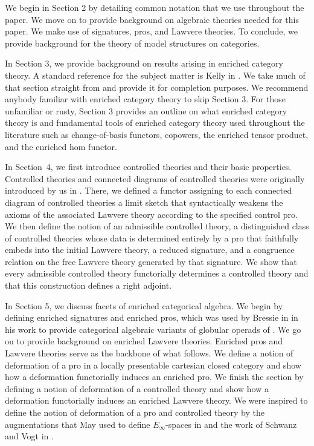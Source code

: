 \documentclass{tac}
\begin{document}
We begin in Section 2 by detailing common notation that we use throughout the paper. We move on to provide background on algebraic theories needed for this paper. We make use of signatures, pros, and Lawvere theories. To conclude, we provide background for the theory of model structures on categories. 

In Section 3, we provide background on results arising in enriched category theory. A standard reference for the subject matter is Kelly in \cite{Kelly3}. We take much of that section straight from \cite{Kelly3} and provide it for completion purposes. We recommend anybody familiar with enriched category theory to skip Section 3.
For those unfamiliar or rusty, Section 3 provides an outline on what enriched category theory is and fundamental tools of enriched category theory used throughout the literature such as change-of-basis functors, copowers, the enriched tensor product, and the enriched hom functor. 

In Section~4, we first introduce controlled theories and their basic properties. Controlled theories and connected diagrams of controlled theories were originally introduced by us in \cite{Taylor2026}. There, we defined a functor assigning to each connected diagram of controlled theories a limit sketch that syntactically weakens the axioms of the associated Lawvere theory according to the specified control pro. We then define the notion of an admissible controlled theory, a distinguished class of controlled theories whose data is determined entirely by a pro that faithfully embeds into the initial Lawvere theory, a reduced signature, and a congruence relation on the free Lawvere theory generated by that signature.  We show that every admissible controlled theory functorially determines a controlled theory and that this construction defines a right adjoint.

 In Section 5, we discuss facets of enriched categorical algebra. We begin by defining enriched signatures and enriched pros, which was used by Bressie in \cite{Bressie2020} in his work to provide categorical algebraic variants of globular operads of \cite{Lein}. We go on to provide background on enriched Lawvere theories. Enriched pros and Lawvere theories serve as the backbone of what follows. We define a notion of deformation of a pro in a locally presentable cartesian closed category and show how a deformation functorially induces an enriched pro. We finish the section by defining a notion of deformation of a controlled theory and show how a deformation functorially induces an enriched Lawvere theory.
 We were inspired to define the notion of deformation of a pro and controlled theory by the augmentations that May used to define $E_\infty$-spaces in \cite{May2} and the work of Schwanz and Vogt in \cite{SchwanzlVogt1989}. 
 
\end{document}
